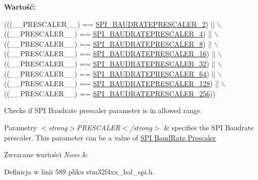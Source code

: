 {\bfseries Wartość\+:}
\begin{DoxyCode}
(((\_\_PRESCALER\_\_) == \hyperlink{group___s_p_i___baud_rate___prescaler_ga3c1e615518e705b8120f164ff4c1968e}{SPI\_BAUDRATEPRESCALER\_2})   || \(\backslash\)
                                                  ((\_\_PRESCALER\_\_) == 
      \hyperlink{group___s_p_i___baud_rate___prescaler_ga807568c52b5ba449d7a2b1b85549db24}{SPI\_BAUDRATEPRESCALER\_4})   || \(\backslash\)
                                                  ((\_\_PRESCALER\_\_) == 
      \hyperlink{group___s_p_i___baud_rate___prescaler_ga2393359eb495f95163206e17194f4847}{SPI\_BAUDRATEPRESCALER\_8})   || \(\backslash\)
                                                  ((\_\_PRESCALER\_\_) == 
      \hyperlink{group___s_p_i___baud_rate___prescaler_gad6a08d920ad4ee524cf55cd09e4c4d0e}{SPI\_BAUDRATEPRESCALER\_16})  || \(\backslash\)
                                                  ((\_\_PRESCALER\_\_) == 
      \hyperlink{group___s_p_i___baud_rate___prescaler_ga53fda39d29f04b815f525b7f8c8dd9c2}{SPI\_BAUDRATEPRESCALER\_32})  || \(\backslash\)
                                                  ((\_\_PRESCALER\_\_) == 
      \hyperlink{group___s_p_i___baud_rate___prescaler_ga64129361cbd23907d14144befe2209f4}{SPI\_BAUDRATEPRESCALER\_64})  || \(\backslash\)
                                                  ((\_\_PRESCALER\_\_) == 
      \hyperlink{group___s_p_i___baud_rate___prescaler_ga939117a1ff97fbf4f1340cbb3141fb29}{SPI\_BAUDRATEPRESCALER\_128}) || \(\backslash\)
                                                  ((\_\_PRESCALER\_\_) == 
      \hyperlink{group___s_p_i___baud_rate___prescaler_ga4debd0953aeeb470eae28a42aa8289c2}{SPI\_BAUDRATEPRESCALER\_256}))
\end{DoxyCode}


Checks if S\+PI Baudrate prescaler parameter is in allowed range. 


\begin{DoxyParams}{Parametry}
{\em $<$strong$>$\+P\+R\+E\+S\+C\+A\+L\+E\+R$<$/strong$>$} & specifies the S\+PI Baudrate prescaler. This parameter can be a value of \hyperlink{group___s_p_i___baud_rate___prescaler}{S\+PI Baud\+Rate Prescaler} \\
\hline
\end{DoxyParams}

\begin{DoxyRetVals}{Zwracane wartości}
{\em None} & \\
\hline
\end{DoxyRetVals}


Definicja w linii 589 pliku stm32f4xx\+\_\+hal\+\_\+spi.\+h.

